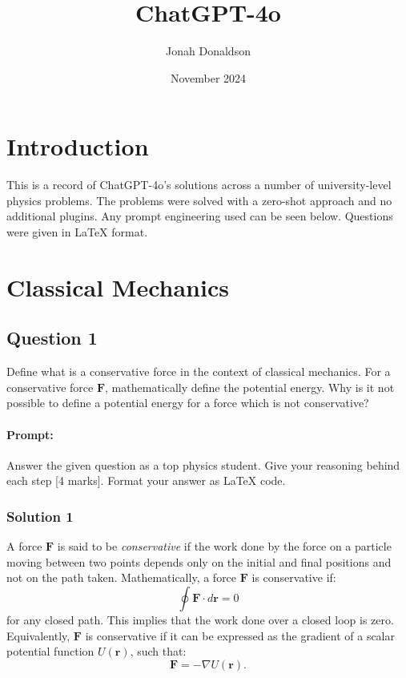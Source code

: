 \documentclass{article}
\title{ChatGPT-4o}
\author{Jonah Donaldson}
\date{November 2024}
\begin{document}
\maketitle

\tableofcontents
\newpage

\section{Introduction}

This is a record of ChatGPT-4o's solutions across a number of university-level physics problems. The problems were solved with a zero-shot approach and no additional plugins. Any prompt engineering used can be seen below. Questions were given in LaTeX format.

\section{Classical Mechanics}

\subsection{Question 1}
Define what is a conservative force in the context of classical mechanics. For a conservative force $\mathbf{F}$, mathematically define the potential energy. Why is it not possible to define a potential energy for a force which is not conservative?

\paragraph{Prompt: \\} 
Answer the given question as a top physics student. Give your reasoning behind each step [4 marks].
Format your answer as LaTeX code.

\subsubsection{Solution 1}
A force $\mathbf{F}$ is said to be \textit{conservative} if the work done by the force on a particle moving between two points depends only on the initial and final positions and not on the path taken. Mathematically, a force $\mathbf{F}$ is conservative if:
\[
\oint \mathbf{F} \cdot d\mathbf{r} = 0
\]
for any closed path. This implies that the work done over a closed loop is zero. Equivalently, $\mathbf{F}$ is conservative if it can be expressed as the gradient of a scalar potential function $U(\mathbf{r})$, such that:
\[
\mathbf{F} = -\nabla U(\mathbf{r}).
\]
\end{document}
